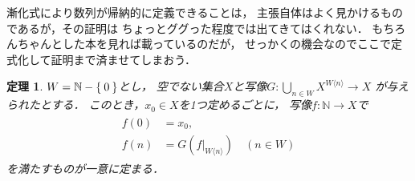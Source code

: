\documentclass[11pt,a4paper]{ltjsarticle} %
\theoremstyle{mystyle} %
\newtheorem{thm}{定理} %
\begin{document}
漸化式により数列が帰納的に定義できることは，
主張自体はよく見かけるものであるが，その証明は
ちょっとググった程度では出てきてはくれない．
もちろんちゃんとした本を見れば載っているのだが，
せっかくの機会なのでここで定式化して証明まで済ませてしまおう．

\begin{thm} \label{thm:inddef}
	$W= \mathbb{N} - \Set{0}$とし，
	空でない集合$X$と写像$G \colon \bigcup_{n \in W }
		X^{W \langle n \rangle} \longrightarrow X$
	が与えられたとする．
	このとき，$x_0 \in X$を1つ定めるごとに，
	写像$f \colon \mathbb{N} \longrightarrow X$で
	\begin{align}
		\begin{aligned}
			f(0) & = x_0 ,                                     \\
			f(n) & = G \left( f|_{W \langle n \rangle} \right)
			\quad ( n \in W )
		\end{aligned}
		\label{eq:inddef}
	\end{align}
	を満たすものが一意に定まる．
\end{thm}
\end{document}
